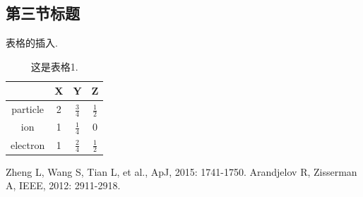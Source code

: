 \documentclass[UTF8, a4paper]{ctexart}
\numberwithin{equation}{section} %
\begin{document}
	\subsection{第三节标题}

		表格的插入.

		\begin{table}[h]
			\renewcommand\arraystretch{2}
			\centering
			\caption{这是表格1.}
			\begin{tabular}{|c|c|c|c|}
				\hline \        & X & Y             & Z             \\
				\hline particle & 2 & $\frac{3}{4}$ & $\frac{1}{2}$ \\
				\hline ion      & 1 & $\frac{1}{4}$ & 0             \\
				\hline electron & 1 & $\frac{2}{4}$ & $\frac{1}{2}$ \\
				\hline
			\end{tabular}
		\end{table}



	\begin{thebibliography}{99} 
		Zheng L, Wang S, Tian L, et al., ApJ, 2015: 1741-1750.  
		Arandjelov R, Zisserman A, IEEE, 2012: 2911-2918.  
	\end{thebibliography}

\end{document}
